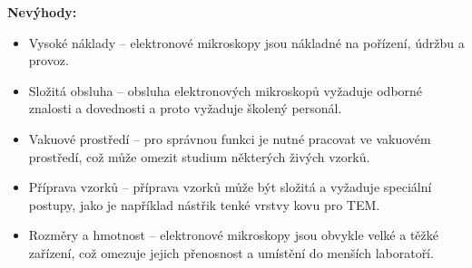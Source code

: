 \textbf{Nevýhody:}
\begin{itemize}
    \item Vysoké náklady -- elektronové mikroskopy jsou nákladné na pořízení, údržbu a provoz.
    \item Složitá obsluha -- obsluha elektronových mikroskopů vyžaduje odborné znalosti a dovednosti a proto vyžaduje školený personál.
    \item Vakuové prostředí -- pro správnou funkci je nutné pracovat ve vakuovém prostředí, což může omezit studium některých živých vzorků.
    \item Příprava vzorků -- příprava vzorků může být složitá a vyžaduje speciální postupy, jako je například nástřik tenké vrstvy kovu pro TEM.
    \item Rozměry a hmotnost -- elektronové mikroskopy jsou obvykle velké a těžké zařízení, což omezuje jejich přenosnost a umístění do menších laboratoří.
\end{itemize}